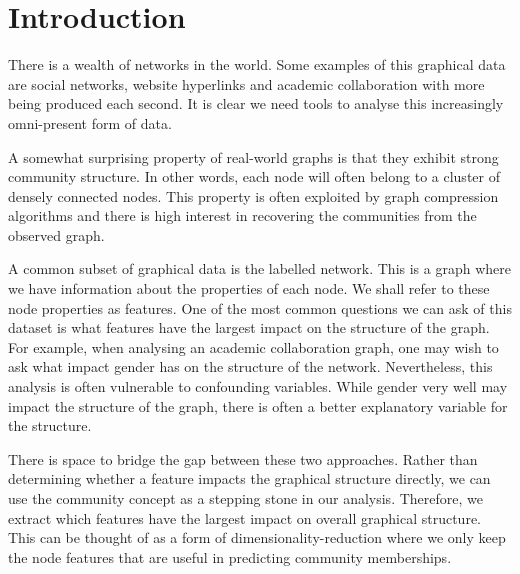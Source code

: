 \section{Introduction}

There is a wealth of networks in the world. Some examples of this graphical data are social networks, website hyperlinks and academic collaboration with more being produced each second. It is clear we need tools to analyse this increasingly omni-present form of data.

A somewhat surprising property of real-world graphs is that they exhibit strong community structure. In other words, each node will often belong to a cluster of densely connected nodes. This property is often exploited by graph compression algorithms and there is high interest in recovering the communities from the observed graph.

A common subset of graphical data is the labelled network. This is a graph where we have information about the properties of each node. We shall refer to these node properties as features. One of the most common questions we can ask of this dataset is what features have the largest impact on the structure of the graph. For example, when analysing an academic collaboration graph, one may wish to ask what impact gender has on the structure of the network.  Nevertheless, this analysis is often vulnerable to confounding variables. While gender very well may impact the structure of the graph, there is often a better explanatory variable for the structure.

There is space to bridge the gap between these two approaches. Rather than determining whether a feature impacts the graphical structure directly, we can use the community concept as a stepping stone in our analysis. Therefore, we extract which features have the largest impact on overall graphical structure. This can be thought of as a form of dimensionality-reduction where we only keep the node features that are useful in predicting community memberships.